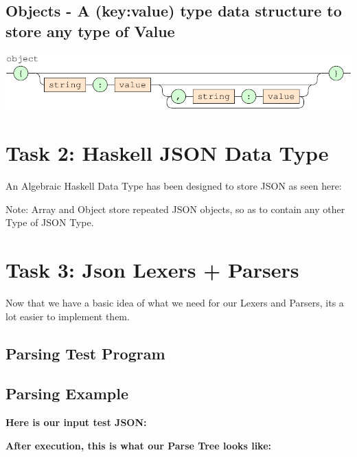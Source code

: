 \documentclass[a4paper]{article}
\begin{document}
\subsection*{Objects - A (key:value) type data structure to store any type of Value }

{\centering

   \includegraphics[scale=0.9]{EBNF/object}

}

\newpage


\section{Task 2: Haskell JSON Data Type}

An Algebraic Haskell Data Type has been designed to store JSON as seen here:

Note: Array and Object store repeated JSON objects, so as to contain any other Type of JSON Type.


\newpage

\section{Task 3: Json Lexers + Parsers}

Now that we have a basic idea of what we need for our Lexers and Parsers, its a lot
easier to implement them.



\subsection*{Parsing Test Program}



\newpage

\subsection*{Parsing Example}

\textbf{Here is our input test JSON:}


\noindent \textbf{After execution, this is what our Parse Tree looks like:}

\end{document}
